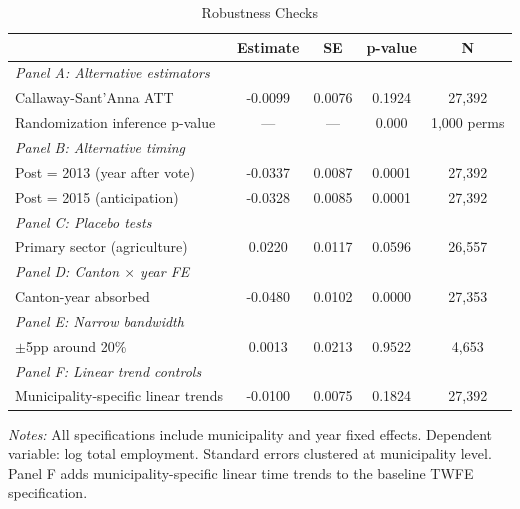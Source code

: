 \begin{table}[htbp]
\centering
\caption{Robustness Checks}
\label{tab:robust}
\begin{tabular}{lcccc}
\toprule
 & Estimate & SE & p-value & N \\
\midrule
\textit{Panel A: Alternative estimators} \\
Callaway-Sant'Anna ATT & -0.0099 & 0.0076 & 0.1924 & 27,392 \\
Randomization inference p-value & --- & --- & 0.000 & 1,000 perms \\
\addlinespace
\textit{Panel B: Alternative timing} \\
Post = 2013 (year after vote) & -0.0337 & 0.0087 & 0.0001 & 27,392 \\
Post = 2015 (anticipation) & -0.0328 & 0.0085 & 0.0001 & 27,392 \\
\addlinespace
\textit{Panel C: Placebo tests} \\
Primary sector (agriculture) & 0.0220 & 0.0117 & 0.0596 & 26,557 \\
\addlinespace
\textit{Panel D: Canton $\times$ year FE} \\
Canton-year absorbed & -0.0480 & 0.0102 & 0.0000 & 27,353 \\
\addlinespace
\textit{Panel E: Narrow bandwidth} \\
$\pm$5pp around 20\% & 0.0013 & 0.0213 & 0.9522 & 4,653 \\
\addlinespace
\textit{Panel F: Linear trend controls} \\
Municipality-specific linear trends & -0.0100 & 0.0075 & 0.1824 & 27,392 \\
\bottomrule
\end{tabular}
\begin{tablenotes}[flushleft]\small
\item \textit{Notes:} All specifications include municipality and year fixed effects.
Dependent variable: log total employment. Standard errors clustered at municipality level.
Panel F adds municipality-specific linear time trends to the baseline TWFE specification.
\end{tablenotes}
\end{table}
